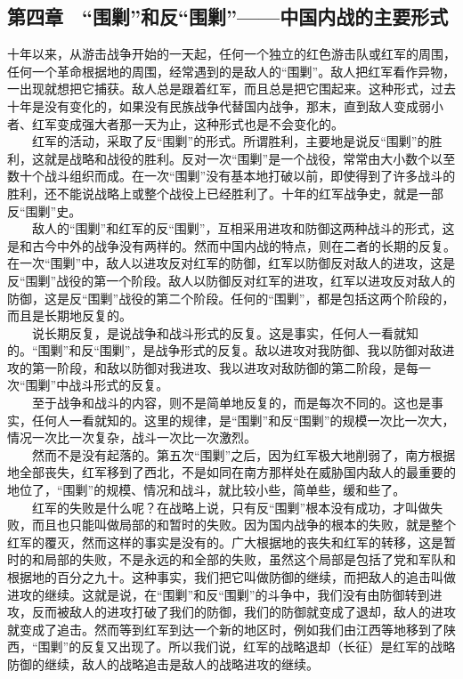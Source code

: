 \documentclass[cn,11pt,chinese]{elegantbook}
\def\myformat#1{\hfil\hfil #1}
\begin{document}
\subsection*{\myformat{第四章　“围剿”和反“围剿”——中国内战的主要形式}}
十年以来，从游击战争开始的一天起，任何一个独立的红色游击队或红军的周围，任何一个革命根据地的周围，经常遇到的是敌人的“围剿”。敌人把红军看作异物，一出现就想把它捕获。敌人总是跟着红军，而且总是把它围起来。这种形式，过去十年是没有变化的，如果没有民族战争代替国内战争，那末，直到敌人变成弱小者、红军变成强大者那一天为止，这种形式也是不会变化的。\\
　　红军的活动，采取了反“围剿”的形式。所谓胜利，主要地是说反“围剿”的胜利，这就是战略和战役的胜利。反对一次“围剿”是一个战役，常常由大小数个以至数十个战斗组织而成。在一次“围剿”没有基本地打破以前，即使得到了许多战斗的胜利，还不能说战略上或整个战役上已经胜利了。十年的红军战争史，就是一部反“围剿”史。\\
　　敌人的“围剿”和红军的反“围剿”，互相采用进攻和防御这两种战斗的形式，这是和古今中外的战争没有两样的。然而中国内战的特点，则在二者的长期的反复。在一次“围剿”中，敌人以进攻反对红军的防御，红军以防御反对敌人的进攻，这是反“围剿”战役的第一个阶段。敌人以防御反对红军的进攻，红军以进攻反对敌人的防御，这是反“围剿”战役的第二个阶段。任何的“围剿”，都是包括这两个阶段的，而且是长期地反复的。\\
　　说长期反复，是说战争和战斗形式的反复。这是事实，任何人一看就知的。“围剿”和反“围剿”，是战争形式的反复。敌以进攻对我防御、我以防御对敌进攻的第一阶段，和敌以防御对我进攻、我以进攻对敌防御的第二阶段，是每一次“围剿”中战斗形式的反复。\\
　　至于战争和战斗的内容，则不是简单地反复的，而是每次不同的。这也是事实，任何人一看就知的。这里的规律，是“围剿”和反“围剿”的规模一次比一次大，情况一次比一次复杂，战斗一次比一次激烈。\\
　　然而不是没有起落的。第五次“围剿”之后，因为红军极大地削弱了，南方根据地全部丧失，红军移到了西北，不是如同在南方那样处在威胁国内敌人的最重要的地位了，“围剿”的规模、情况和战斗，就比较小些，简单些，缓和些了。\\
　　红军的失败是什么呢？在战略上说，只有反“围剿”根本没有成功，才叫做失败，而且也只能叫做局部的和暂时的失败。因为国内战争的根本的失败，就是整个红军的覆灭，然而这样的事实是没有的。广大根据地的丧失和红军的转移，这是暂时的和局部的失败，不是永远的和全部的失败，虽然这个局部是包括了党和军队和根据地的百分之九十。这种事实，我们把它叫做防御的继续，而把敌人的追击叫做进攻的继续。这就是说，在“围剿”和反“围剿”的斗争中，我们没有由防御转到进攻，反而被敌人的进攻打破了我们的防御，我们的防御就变成了退却，敌人的进攻就变成了追击。然而等到红军到达一个新的地区时，例如我们由江西等地移到了陕西，“围剿”的反复又出现了。所以我们说，红军的战略退却（长征）是红军的战略防御的继续，敌人的战略追击是敌人的战略进攻的继续。\\
\end{document}
